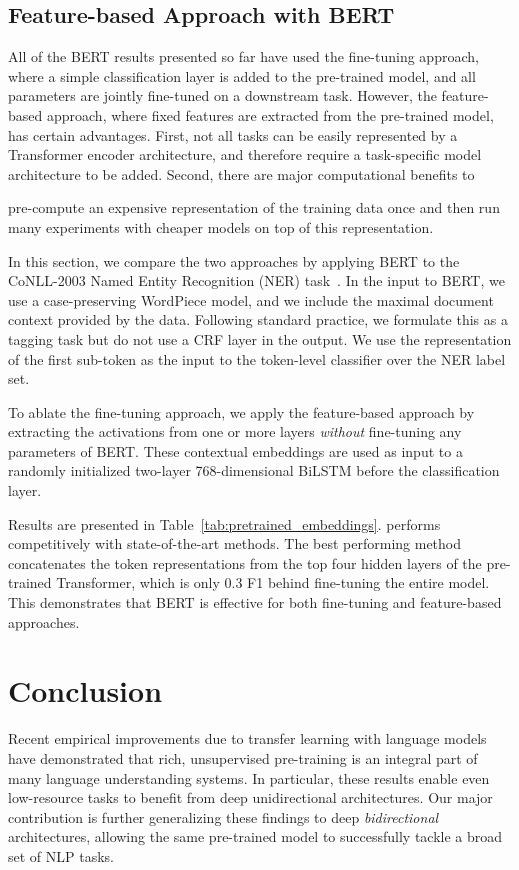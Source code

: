 \subsection{Feature-based Approach with BERT}
\label{sec:ner}
All of the BERT results presented so far have used the fine-tuning approach, where a simple classification layer is added to the pre-trained model, and all parameters are jointly fine-tuned on a downstream task. However, the feature-based approach, where fixed features are extracted from the pre-trained model, has certain advantages. First, not all tasks can be easily represented by a Transformer encoder architecture, and therefore require a task-specific model architecture to be added. Second, there are major computational benefits to

pre-compute an expensive representation of the training data once and then run many experiments with cheaper models on top of this representation. 

In this section, we compare the two approaches by applying BERT to the CoNLL-2003 Named Entity Recognition (NER) task~\cite{tjong-de:2003}. In the input to BERT, we use a case-preserving WordPiece model, and we include the maximal document context provided by the data. Following standard practice, we formulate this as a tagging task but do not use a CRF layer in the output. We use the representation of the first sub-token as the input to the token-level classifier over the NER label set.

To ablate the fine-tuning approach, we apply the feature-based approach by extracting the activations from one or more layers {\it without} fine-tuning any parameters of BERT. These contextual embeddings are used as input to a randomly initialized two-layer 768-dimensional BiLSTM before the classification layer.

Results are presented in Table~\ref{tab:pretrained_embeddings}. \bertlarge performs competitively with state-of-the-art methods. The best performing method concatenates the token representations from the top four hidden layers of the pre-trained Transformer, which is only 0.3 F1 behind fine-tuning the entire model. This demonstrates that BERT is effective for both fine-tuning and feature-based approaches.

\section{Conclusion}
Recent empirical improvements due to transfer learning with language models have demonstrated that rich, unsupervised pre-training is an integral part of many language understanding systems. In particular, these results enable even low-resource tasks to benefit from deep unidirectional architectures. Our major contribution is further generalizing these findings to deep \emph{bidirectional} architectures, allowing the same pre-trained model to successfully tackle a broad set of NLP tasks.


